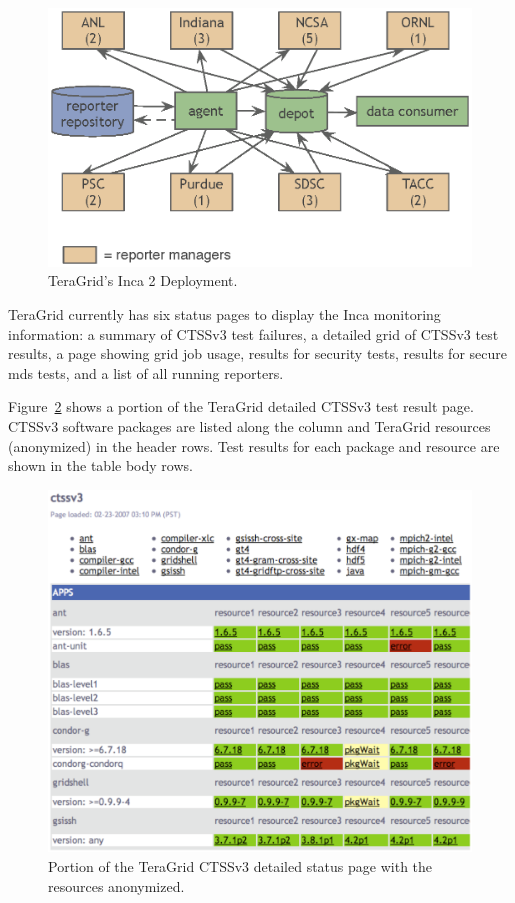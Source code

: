 \documentclass[times,10pt,twocolumn]{article}
\begin{document}
\begin{figure}[hbt]
  \centering
  \includegraphics[scale=0.6]{tg-deploy.eps}
  \caption{TeraGrid's Inca 2 Deployment.}
  \label{tg_deploy_fig}
\end{figure}

TeraGrid currently has six status pages to display the Inca monitoring
information: a summary of CTSSv3 test failures, a detailed grid of CTSSv3 test
results, a page showing grid job
usage, results for security tests, results for secure mds tests, and a list of
all running reporters.

Figure~\ref{status_page_fig} shows a portion of the TeraGrid detailed CTSSv3 
test result
page.  CTSSv3 software packages are listed along the column and TeraGrid
resources (anonymized) in the header rows.  Test results for each package and
resource are shown in the table body rows.

\begin{figure}[hbt]
  \centering
  \includegraphics[scale=0.4]{status-page.eps}
  \caption{Portion of the TeraGrid CTSSv3 detailed status page with the
  resources anonymized.}
  \label{status_page_fig}
\end{figure}
\end{document}
